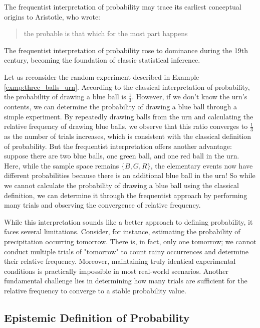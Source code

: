 The frequentist interpretation of probability may trace its earliest conceptual origins to Aristotle, who wrote:
\begin{quote}
	the probable is that which for the most part happens
\end{quote}
The frequentist interpretation of probability rose to dominance during the 19th century, becoming the foundation of classic statistical inference.

Let us reconsider the random experiment described in Example \autoref{exmp:three_balls_urn}.
According to the classical interpretation of probability, the probability of drawing a blue ball is \( \frac{1}{3} \).
However, if we don't know the urn's contents, we can determine the probability of drawing a blue ball through a simple experiment.
By repeatedly drawing balls from the urn and calculating the relative frequency of drawing blue balls,
we observe that this ratio converges to \( \frac{1}{3} \) as the number of trials increases,
which is consistent with the classical definition of probability.
But the frequentist interpretation offers another advantage:
suppose there are two blue balls, one green ball, and one red ball in the urn.
Here, while the sample space remains \( \{ B, G, R \} \), the elementary events now have different probabilities
because there is an additional blue ball in the urn!
So while we cannot calculate the probability of drawing a blue ball using the classical definition,
we can determine it through the frequentist approach by performing many trials and observing the convergence of relative frequency.

While this interpretation sounds like a better approach to defining probability,
it faces several limitations. 
Consider, for instance, estimating the probability of precipitation occurring tomorrow.
There is, in fact, only one tomorrow;
we cannot conduct multiple trials of "tomorrow" to count rainy occurrences and determine their relative frequency.
Moreover, maintaining truly identical experimental conditions is practically impossible in most real-world scenarios.
Another fundamental challenge lies in determining how many trials are sufficient for the relative frequency to converge to a stable probability value.

\subsection{Epistemic Definition of Probability}

